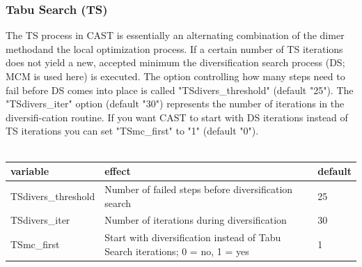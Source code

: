 \documentclass[10pt,a4paper]{article} %
\begin{document}
	\subsubsection{Tabu Search (TS)}
	The \acf{TS} process in \ac{CAST} is essentially an alternating combination of the dimer method\supercite{dimermethod}and the local optimization process.
	If a certain number of \ac{TS} iterations does not yield a new, accepted minimum the diversification search process (DS; MCM is used here) is executed. The option controlling how many steps need to fail before DS comes into place is called "TSdivers_threshold" (default "25").
	The "TSdivers_iter" option (default "30") represents the number of iterations in the diversifi-cation routine.
	If you want \ac{CAST} to start with DS iterations instead of \ac{TS} iterations you can set "TSmc_first" to "1" (default "0").\\~\\

	\begin{tabularx}{\textwidth}{l|X|X}
		variable & effect & default \\
		\hline
		TSdivers_threshold & Number of failed steps before diversification search & 25 \\
		TSdivers_iter & Number of iterations during diversification & 30 \\
		TSmc_first & Start with diversification instead of Tabu Search iterations; 0 = no, 1 = yes & 1 \\
	\end{tabularx}
	\\~\\

\end{document}
